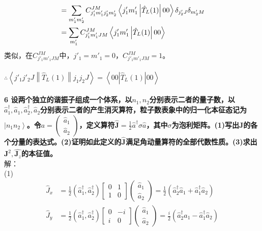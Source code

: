 \documentclass[12pt]{article}
\numberwithin{equation}{section}	 %
\begin{document}
\begin{spacing}{1.5}
\begin{align}
&= \sum_{m'_{1}m'_{2}}C^{JM}_{j'_{1}m'_{1}j'_{2}m'_{2}}\left<j'_{1}m'_{1}\left| \hat{T}_{L}(1) \right|00\right>\delta_{j'_{2}J}\delta_{m'_{2}M} \notag \\
&= \sum_{m'_{1}}C^{JM}_{j'_{1}m'_{1}JM}\left<j'_{1}m'_{1}\left| \hat{T}_{L}(1) \right|00\right> \notag
\end{align}
类似，在$C^{JM}_{j'_{1}m'_{1}JM}$中，$j'_{1}=m'_{1}=0$，$C^{JM}_{j'_{1}m'_{1}JM}=1$。\\
~\\
$\therefore \left< j'_{1}j'_{2}J \left\| \hat{T}_{L}(1) \right\| j_{1}j_{2}J \right>=\left<00\left| \hat{T}_{L}(1) \right|00\right>$
~\\
~\\
\textbf{6 \quad 设两个独立的谐振子组成一个体系，以$n_{1},n_{2}$分别表示二者的量子数，以$\hat{a}^{\dagger}_{1},\hat{a}_{1},\hat{a}^{\dagger}_{2},\hat{a}_{2}$分别表示二者的产生消灭算符，粒子数表象中的归一化本征态记为$\left| n_{1}n_{2} \right>$。令$a=\begin{pmatrix} \hat{a}_{1} \\ \hat{a}_{2} \end{pmatrix}$，定义算符$\displaystyle \hat{\bm{J}}=\frac{1}{2}\hat{a}^{\dagger}\sigma\hat{a}$，其中$\sigma$为泡利矩阵。(1)写出$\bm J$的各个分量的表达式。(2)证明如此定义的$\hat{\bm{J}}$满足角动量算符的全部代数性质。(3)求出$\hat{\bm{J}^{2}},\hat{\bm{J}_{z}}$的本征值。}\\
解：\\
(1) 
\begin{equation}
\begin{aligned}
\hat{J}_{x} &= \frac{1}{2}\left(\hat{a}^{\dagger}_{1},\hat{a}^{\dagger}_{2}\right) \begin{bmatrix} 0 & 1 \\ 1 & 0 \end{bmatrix}\begin{pmatrix} \hat{a}_{1} \\ \hat{a}_{2} \end{pmatrix} = \frac{1}{2}(\hat{a}^{\dagger}_{2}\hat{a}_{1} + \hat{a}^{\dagger}_{1}\hat{a}_{2}) \\
\hat{J}_{y} &= \frac{1}{2}\left(\hat{a}^{\dagger}_{1},\hat{a}^{\dagger}_{2}\right) \begin{bmatrix} 0 & -i \\ i & 0 \end{bmatrix}\begin{pmatrix} \hat{a}_{1} \\ \hat{a}_{2} \end{pmatrix} = \frac{i}{2}(\hat{a}^{\dagger}_{2}\hat{a}_{1} - \hat{a}^{\dagger}_{1}\hat{a}_{2}) \\

\end{aligned}
\end{equation}
\end{spacing}
\end{document}
